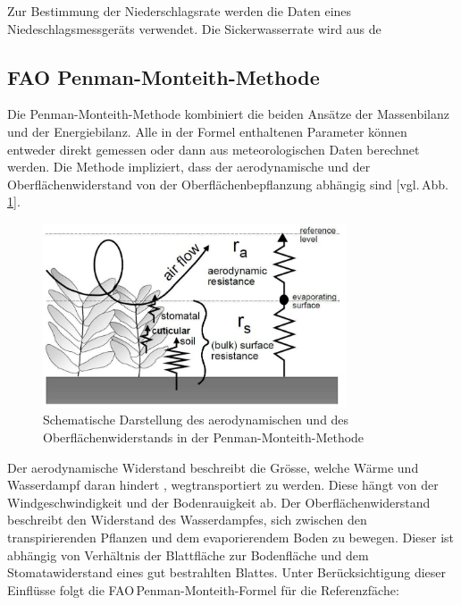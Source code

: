  Zur Bestimmung der Niederschlagsrate werden die Daten eines Niedeschlagsmessgeräts verwendet. Die Sickerwasserrate wird aus de


\subsection{FAO Penman-Monteith-Methode}

Die Penman-Monteith-Methode kombiniert die beiden Ansätze der Massenbilanz und der Energiebilanz. Alle in der Formel enthaltenen Parameter können entweder direkt gemessen oder dann aus meteorologischen Daten berechnet werden. Die Methode impliziert, dass der aerodynamische und der Oberflächenwiderstand von der Oberflächenbepflanzung abhängig sind [vgl.\,Abb.\,\ref{fig:widerstand}]. 

\begin{figure}[H]
\centering
\includegraphics[width=0.8\textwidth]{figures/penman_widerstand.jpg}
\caption{Schematische Darstellung des aerodynamischen und des Oberflächenwiderstands in der Penman-Monteith-Methode}
\label{fig:widerstand}
\end{figure}

Der aerodynamische Widerstand beschreibt die Grösse, welche Wärme und Wasserdampf daran hindert , wegtransportiert zu werden. Diese hängt von der Windgeschwindigkeit und der Bodenrauigkeit ab. Der Oberflächenwiderstand beschreibt den Widerstand des Wasserdampfes, sich zwischen den transpirierenden Pflanzen und dem evaporierendem Boden zu bewegen. Dieser ist abhängig von Verhältnis der Blattfläche zur Bodenfläche und dem Stomatawiderstand eines gut bestrahlten Blattes. Unter Berücksichtigung dieser Einflüsse folgt die FAO\,Penman-Monteith-Formel für die Referenzfäche:

